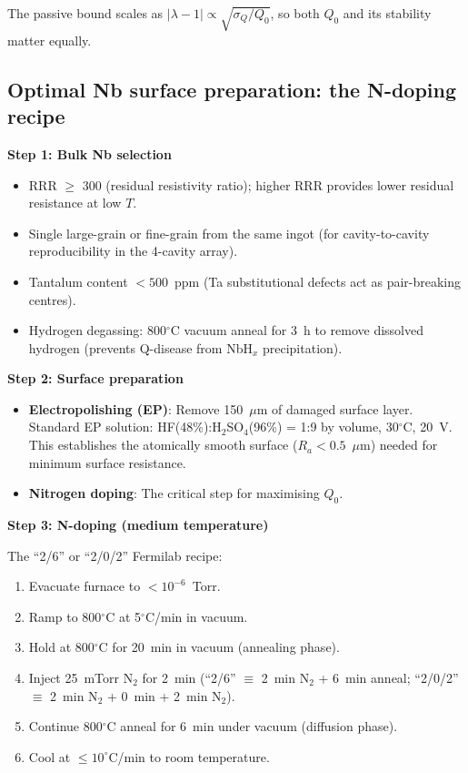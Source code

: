 \documentclass[11pt]{article}
\theoremstyle{definition}
\theoremstyle{remark}
\newcommand{\lam}{|\lambda-1|}
\begin{document}
The passive bound scales as $\lam \propto \sqrt{\sigma_Q/Q_0}$, so
both $Q_0$ and its stability matter equally.

\subsection{Optimal Nb surface preparation: the N-doping recipe}

\begin{tcolorbox}[colback=green!5!white, colframe=green!50!black,
  title=\textbf{RECOMMENDED Nb PREPARATION PROTOCOL FOR PHASE~I}]

\textbf{Step 1: Bulk Nb selection}
\begin{itemize}[nosep]
  \item RRR $\geq$ 300 (residual resistivity ratio); higher RRR
    provides lower residual resistance at low $T$.
  \item Single large-grain or fine-grain from the same ingot
    (for cavity-to-cavity reproducibility in the 4-cavity array).
  \item Tantalum content $< 500$~ppm (Ta substitutional defects
    act as pair-breaking centres).
  \item Hydrogen degassing: 800$^\circ$C vacuum anneal for 3~h
    to remove dissolved hydrogen (prevents Q-disease from NbH$_x$
    precipitation).
\end{itemize}

\textbf{Step 2: Surface preparation}
\begin{itemize}[nosep]
  \item \textbf{Electropolishing (EP)}: Remove 150~$\mu$m of damaged
    surface layer. Standard EP solution: HF(48\%):H$_2$SO$_4$(96\%)
    = 1:9 by volume, 30$^\circ$C, 20~V. This establishes the
    atomically smooth surface ($R_a < 0.5$~$\mu$m) needed for
    minimum surface resistance.
  \item \textbf{Nitrogen doping}: The critical step for maximising $Q_0$.
\end{itemize}

\textbf{Step 3: N-doping (medium temperature)}

The ``2/6'' or ``2/0/2'' Fermilab recipe:
\begin{enumerate}[nosep]
  \item Evacuate furnace to $<10^{-6}$~Torr.
  \item Ramp to 800$^\circ$C at 5$^\circ$C/min in vacuum.
  \item Hold at 800$^\circ$C for 20~min in vacuum (annealing phase).
  \item Inject 25~mTorr N$_2$ for 2~min (``2/6'' $\equiv$ 2~min N$_2$
    + 6~min anneal; ``2/0/2'' $\equiv$ 2~min N$_2$ + 0~min + 2~min
    N$_2$).
  \item Continue 800$^\circ$C anneal for 6~min under vacuum
    (diffusion phase).
  \item Cool at $\leq 10^\circ$C/min to room temperature.
\end{enumerate}


\end{tcolorbox}
\end{document}
